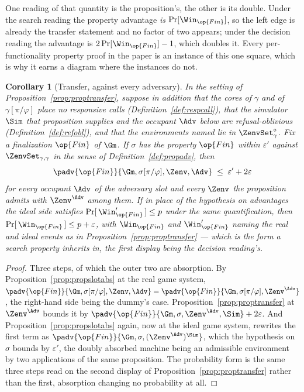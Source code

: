 \documentclass[10pt,oneside,openany]{book}
\newcounter{diagram}
\theoremstyle{accentdef}
\theoremstyle{accentplain}
\newtheorem{corollary}[definition]{Corollary}
\begin{document}
One reading of that quantity is the proposition's, the other is its double. Under the search
reading the property advantage \emph{is} $\Pr[\Win_{\op{Fin}}]$, so the left edge is already the
transfer statement and no factor of two appears; under the decision reading the advantage is
$2\Pr[\Win_{\op{Fin}}]-1$, which doubles it. Every per-functionality property proof in the paper
is an instance of this one square, which is why it earns a diagram where the instances do not.

\begin{corollary}[Transfer, against every adversary]\label{cor:proptransfer2}
In the setting of Proposition~\ref{prop:proptransfer}, suppose in addition that the cores of $\gamma$
and of $\gamma[\pi/\varphi]$ place no responsive calls (Definition~\ref{def:respcall}), that the
simulator $\Sim$ that proposition supplies and the occupant $\Adv$ below are refusal-oblivious
(Definition~\ref{def:refobl}), and that the environments named lie in $\ZenvSet^{\circ}_{\gamma}$. Fix
a finalization $\op{Fin}$ of $\Gm$. If
$\sigma$ has the property $\op{Fin}$ within $\varepsilon'$ against $\ZenvSet_{\gamma,\gamma}$ in the
sense of Definition~\ref{def:propadv}, then
\[
  \padv{\op{Fin}}{\Gm,\sigma[\pi/\varphi],\Zenv,\Adv} \;\leq\; \varepsilon' + 2\varepsilon
\]
for every occupant $\Adv$ of the adversary slot and every $\Zenv$ the proposition admits with
$\Zenv^{\Adv}$ among them. If in place of the hypothesis on advantages the ideal side satisfies
$\Pr[\,\Win'_{\op{Fin}}\,] \leq p$ under the same quantification, then
$\Pr[\,\Win_{\op{Fin}}\,] \leq p + \varepsilon$, with
$\Win_{\op{Fin}}$ and $\Win'_{\op{Fin}}$ naming the real and ideal events as in
Proposition~\ref{prop:proptransfer} --- which is the form a search property inherits in, the first
display being the decision reading's.
\end{corollary}

\begin{proof}
Three steps, of which the outer two are absorption. By
Proposition~\ref{prop:propslotabs} at the real game system,
$\padv{\op{Fin}}{\Gm,\sigma[\pi/\varphi],\Zenv,\Adv} =
\padv{\op{Fin}}{\Gm,\sigma[\pi/\varphi],\Zenv^{\Adv}}$,
the right-hand side being the dummy's case. Proposition~\ref{prop:proptransfer} at $\Zenv^{\Adv}$
bounds it by $\padv{\op{Fin}}{\Gm,\sigma,\Zenv^{\Adv},\Sim} + 2\varepsilon$. And
Proposition~\ref{prop:propslotabs} again, now at the ideal game system, rewrites the first term as
$\padv{\op{Fin}}{\Gm,\sigma,(\Zenv^{\Adv})^{\Sim}}$, which the hypothesis on $\sigma$ bounds by
$\varepsilon'$, the doubly absorbed machine being an admissible environment by two applications of the
same proposition. The probability form is the same three steps read on the second display of
Proposition~\ref{prop:proptransfer} rather than the first, absorption changing no probability at all.
\end{proof}
\end{document}
